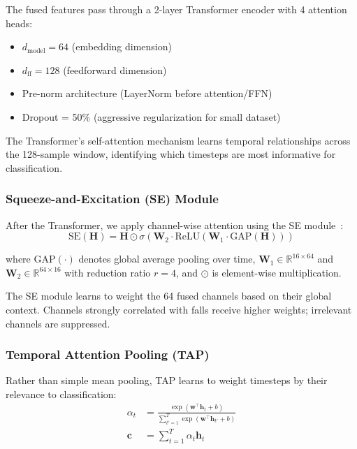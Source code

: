 The fused features pass through a 2-layer Transformer encoder with 4 attention heads:
\begin{itemize}
\item $d_{\text{model}} = 64$ (embedding dimension)
\item $d_{\text{ff}} = 128$ (feedforward dimension)
\item Pre-norm architecture (LayerNorm before attention/FFN)
\item Dropout = 50\% (aggressive regularization for small dataset)
\end{itemize}

The Transformer's self-attention mechanism learns temporal relationships across the 128-sample window, identifying which timesteps are most informative for classification.

\subsubsection{Squeeze-and-Excitation (SE) Module}

After the Transformer, we apply channel-wise attention using the SE module~\cite{hu2018squeeze}:
\begin{equation}
\text{SE}(\mathbf{H}) = \mathbf{H} \odot \sigma\left(\mathbf{W}_2 \cdot \text{ReLU}(\mathbf{W}_1 \cdot \text{GAP}(\mathbf{H}))\right)
\label{eq:se_module}
\end{equation}

where $\text{GAP}(\cdot)$ denotes global average pooling over time, $\mathbf{W}_1 \in \mathbb{R}^{16 \times 64}$ and $\mathbf{W}_2 \in \mathbb{R}^{64 \times 16}$ with reduction ratio $r = 4$, and $\odot$ is element-wise multiplication.

The SE module learns to weight the 64 fused channels based on their global context. Channels strongly correlated with falls receive higher weights; irrelevant channels are suppressed.

\subsubsection{Temporal Attention Pooling (TAP)}

Rather than simple mean pooling, TAP learns to weight timesteps by their relevance to classification:
\begin{align}
\alpha_t &= \frac{\exp(\mathbf{w}^\top \mathbf{h}_t + b)}{\sum_{t'=1}^{T} \exp(\mathbf{w}^\top \mathbf{h}_{t'} + b)} \label{eq:tap_weights} \\
\mathbf{c} &= \sum_{t=1}^{T} \alpha_t \mathbf{h}_t \label{eq:tap_context}
\end{align}

